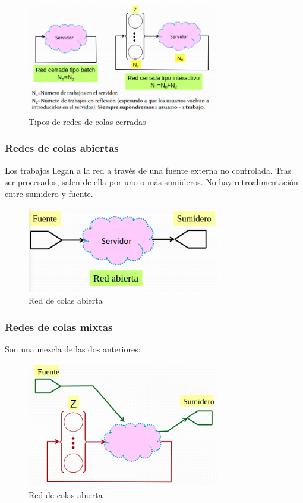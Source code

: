 \documentclass[12pt,spanish]{article}
\begin{document}
\begin{figure}[H]
	\centering
	\includegraphics[width=0.75\textwidth]{cerradas.png}
	\caption{Tipos de redes de colas cerradas}
\end{figure}

\subsubsection{Redes de colas abiertas}

Los trabajos llegan a la red a través de una fuente externa no controlada. Tras ser procesados, salen de ella por uno o más sumideros. No hay retroalimentación entre sumidero y fuente.

\begin{figure}[H]
	\centering
	\includegraphics[width=0.75\textwidth]{abiertas.png}
	\caption{Red de colas abierta}
\end{figure}

\subsubsection{Redes de colas mixtas}

Son una mezcla de las dos anteriores:

\begin{figure}[H]
	\centering
	\includegraphics[width=0.75\textwidth]{mixtas.png}
	\caption{Red de colas abierta}
\end{figure}
\end{document}
